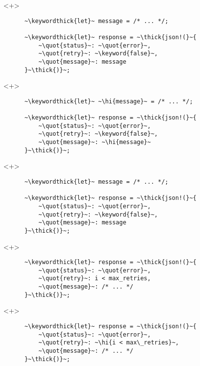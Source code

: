 \documentclass[usepdftitle=false,aspectratio=169]{beamer}
\newcommand{\thick}[1]{\contourlength{0.16pt}\contour[10]{black}{#1}}
\newcommand{\slantbox}[2][.5]
  {%
    \mbox
      {%
        \sbox{\foobox}{#2}%
        \hskip\wd\foobox
        \pdfsave
        \pdfsetmatrix{1 0 #1 1}%
        \llap{\usebox{\foobox}}%
        \pdfrestore
      }%
  }
\newcommand{\backslantbox}[2][.5]
  {%
    \mbox
      {%
        \sbox{\foobox}{#2}%
        \hskip\wd\foobox
        \pdfsave
        \pdfsetmatrix{-1 0 #1 1}%
        \llap{\usebox{\foobox}}%
        \pdfrestore
      }%
  }
\newcommand{\hi}[1]{%
\tikz[baseline=(A.base)]
 \node[highlighting=yellowbg,inner sep=0pt,text depth=0pt] (A) {#1};%
}
\newcommand{\openquote}{\backslantbox[.2]{\hspace{11pt}''\hspace{-11pt}}}
\newcommand{\closequote}{\slantbox[-.2]{\hspace{2pt}''\hspace{-2pt}}}
\newcommand{\blackquote}[1]{\openquote#1\closequote}
\newcommand{\quot}[1]{{\color{redish}\blackquote{#1}}}
\newcommand{\keyword}[1]{\color{greenish}#1}
\newcommand{\keywordthick}[1]{\color{greenish}\contourlength{0.20pt}\contour[10]{greenish}{#1}}
\begin{document}
\begin{frame}[fragile]
  \begin{onlyenv}<+>
    \begin{verbatim}
      ~\keywordthick{let}~ message = /* ... */;

      ~\keywordthick{let}~ response = ~\thick{json!(}~{
          ~\quot{status}~: ~\quot{error}~,
          ~\quot{retry}~: ~\keyword{false}~,
          ~\quot{message}~: message
      }~\thick{)}~;
    \end{verbatim}
  \end{onlyenv}
  \begin{onlyenv}<+>
    \begin{verbatim}
      ~\keywordthick{let}~ ~\hi{message}~ = /* ... */;

      ~\keywordthick{let}~ response = ~\thick{json!(}~{
          ~\quot{status}~: ~\quot{error}~,
          ~\quot{retry}~: ~\keyword{false}~,
          ~\quot{message}~: ~\hi{message}~
      }~\thick{)}~;
    \end{verbatim}
  \end{onlyenv}
  \begin{onlyenv}<+>
    \begin{verbatim}
      ~\keywordthick{let}~ message = /* ... */;

      ~\keywordthick{let}~ response = ~\thick{json!(}~{
          ~\quot{status}~: ~\quot{error}~,
          ~\quot{retry}~: ~\keyword{false}~,
          ~\quot{message}~: message
      }~\thick{)}~;
    \end{verbatim}
  \end{onlyenv}
\end{frame}

\begin{frame}[fragile]
  \begin{onlyenv}<+>
    \begin{verbatim}
      ~\keywordthick{let}~ response = ~\thick{json!(}~{
          ~\quot{status}~: ~\quot{error}~,
          ~\quot{retry}~: i < max_retries,
          ~\quot{message}~: /* ... */
      }~\thick{)}~;
    \end{verbatim}
  \end{onlyenv}
  \begin{onlyenv}<+>
    \begin{verbatim}
      ~\keywordthick{let}~ response = ~\thick{json!(}~{
          ~\quot{status}~: ~\quot{error}~,
          ~\quot{retry}~: ~\hi{i < max\_retries}~,
          ~\quot{message}~: /* ... */
      }~\thick{)}~;
    \end{verbatim}
  \end{onlyenv}
\end{frame}
\end{document}
